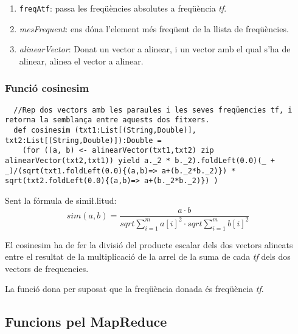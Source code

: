 \documentclass[11pt,a4paper,twoside]{report}
\begin{document}
\begin{enumerate}
  \item \texttt{freqAtf}: passa les freqüències absolutes a freqüència \textit{tf}.
  \item \textit{mesFrequent}: ens dóna l'element més freqüent de la llista de freqüències.
  \item \textit{alinearVector}: Donat un vector a alinear, i un vector amb el qual s'ha de alinear, alinea el vector a alinear.
\end{enumerate}

\subsubsection*{Funció cosinesim}

\begin{lstlisting}
  //Rep dos vectors amb les paraules i les seves freqüencies tf, i retorna la semblança entre aquests dos fitxers.
  def cosinesim (txt1:List[(String,Double)], txt2:List[(String,Double)]):Double =
    (for ((a, b) <- alinearVector(txt1,txt2) zip alinearVector(txt2,txt1)) yield a._2 * b._2).foldLeft(0.0)(_ + _)/(sqrt(txt1.foldLeft(0.0){(a,b)=> a+(b._2*b._2)}) * sqrt(txt2.foldLeft(0.0){(a,b)=> a+(b._2*b._2)}) )
\end{lstlisting}

Sent la fórmula de simi\l.litud: \[sim(a,b) = \frac{a \cdot b}{sqrt{\sum_{i=1}^m a[i]^2} \cdot sqrt{\sum_{i=1}^m b[i]^2}}\]

El cosinesim ha de fer la divisió del producte escalar dels dos vectors alineats entre el resultat de la multiplicació de la arrel de la suma de cada \textit{tf} dels dos vectors de frequencies.

La funció dona per suposat que la freqüència donada és freqüència \textit{tf}.

\subsection{Funcions pel MapReduce}
\end{document}

